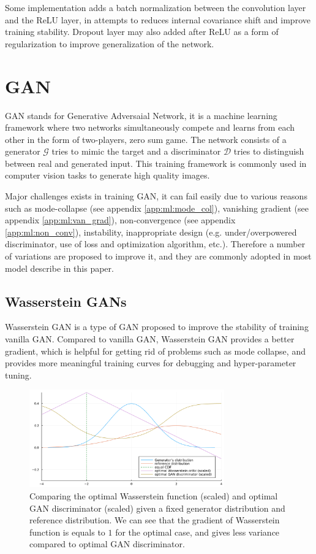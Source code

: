 Some implementation adds a batch normalization between the convolution layer and the ReLU layer, in attempts to reduces internal covariance shift and improve training stability. Dropout layer may also added after ReLU as a form of regularization to improve generalization of the network.

\section{GAN}

GAN stands for Generative Adversaial Network\cite{goodfellowGenerativeAdversarialNetworks2014a}, it is a machine learning framework where two networks simultaneously compete and learns from each other in the form of two-players, zero sum game. The network consists of a generator $\mathcal{G}$ tries to mimic the target and a discriminator $\mathcal{D}$ tries to distinguish between real and generated input. This training framework is commonly used in computer vision tasks to generate high quality images.

Major challenges exists in training GAN, it can fail easily due to various reasons such as mode-collapse (see appendix \ref{app:ml:mode_col}), vanishing gradient (see appendix \ref{app:ml:van_grad}), non-convergence (see appendix \ref{app:ml:non_conv}), instability, inappropriate design (e.g. under/overpowered discriminator, use of loss and optimization algorithm, etc.). Therefore a number of variations are proposed to improve it, and they are commonly adopted in most model describe in this paper.


\subsection{Wasserstein GANs}
Wasserstein GAN\cite{arjovskyWassersteinGAN2017} is a type of GAN proposed to improve the stability of training vanilla GAN. Compared to vanilla GAN, Wasserstein GAN provides a better gradient, which is helpful for getting rid of problems such as mode collapse, and provides more meaningful training curves for debugging and hyper-parameter tuning.

\begin{figure}
    \centering
    \includegraphics[width=0.75\textwidth]{images/preliminary/wgan_vs_gan_grad.png}
    \caption{Comparing the optimal Wasserstein function (scaled) and optimal GAN discriminator (scaled) given a fixed generator distribution and reference distribution. We can see that the gradient of Wasserstein function is equals to $1$ for the optimal case, and gives less variance compared to optimal GAN discriminator.\cite{FileWassersteinGANCritic}} 
    \label{fig:wgan_vs_gan_grad}
\end{figure}

